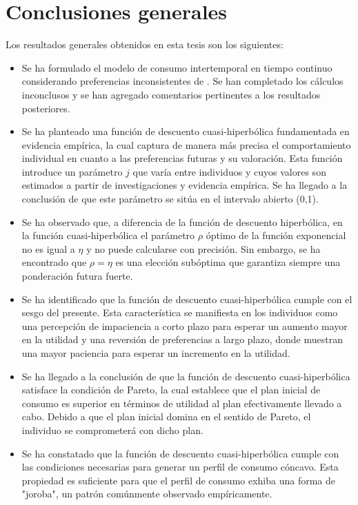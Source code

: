 \chapter*{Conclusiones generales}

Los resultados generales obtenidos en esta tesis son los siguientes:

\begin{itemize}
\item Se ha formulado el modelo de consumo intertemporal en tiempo continuo considerando preferencias inconsistentes de \textcite{feigenbaum2021deviation}. Se han completado los cálculos inconclusos y se han agregado comentarios pertinentes a los resultados posteriores.
\item Se ha planteado una función de descuento cuasi-hiperbólica fundamentada en evidencia empírica, la cual captura de manera más precisa el comportamiento individual en cuanto a las preferencias futuras y su valoración. Esta función introduce un parámetro $j$ que varía entre individuos y cuyos valores son estimados a partir de investigaciones y evidencia empírica. Se ha llegado a la conclusión de que este parámetro se sitúa en el intervalo abierto (0,1).
\item Se ha observado que, a diferencia de la función de descuento hiperbólica, en la función cuasi-hiperbólica el parámetro $\rho$ óptimo de la función exponencial no es igual a $\eta$ y no puede calcularse con precisión. Sin embargo, se ha encontrado que $\rho=\eta$ es una elección subóptima que garantiza siempre una ponderación futura fuerte.
\item Se ha identificado que la función de descuento cuasi-hiperbólica cumple con el sesgo del presente. Esta característica se manifiesta en los individuos como una percepción de impaciencia a corto plazo para esperar un aumento mayor en la utilidad y una reversión de preferencias a largo plazo, donde muestran una mayor paciencia para esperar un incremento en la utilidad. 
\item Se ha llegado a la conclusión de que la función de descuento cuasi-hiperbólica satisface la condición de Pareto, la cual establece que el plan inicial de consumo es superior en términos de utilidad al plan efectivamente llevado a cabo. Debido a que el plan inicial domina en el sentido de Pareto, el individuo se comprometerá con dicho plan.  
\item	Se ha constatado que la función de descuento cuasi-hiperbólica cumple con las condiciones necesarias para generar un perfil de consumo cóncavo. Esta propiedad es suficiente para que el perfil de consumo exhiba una forma de "joroba", un patrón comúnmente observado empíricamente.
\end{itemize}


